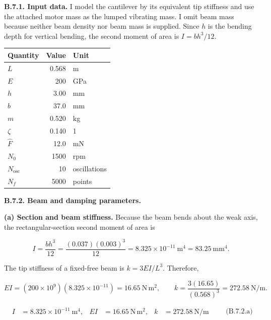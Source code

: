 \begingroup
\setlength{\abovedisplayskip}{6pt}
\setlength{\belowdisplayskip}{6pt}
\setlength{\abovedisplayshortskip}{4pt}
\setlength{\belowdisplayshortskip}{4pt}
\setlength{\intextsep}{6pt}

\textbf{B.7.1. Input data.} I model the cantilever by its equivalent tip stiffness and use the attached motor mass as the lumped vibrating mass. I omit beam mass because neither beam density nor beam mass is supplied. Since $h$ is the bending depth for vertical bending, the second moment of area is $I=bh^3/12$.

{ %
\begin{center}\small\begin{tabular}{@{}lrl@{}}
\toprule\noalign{}
Quantity & Value & Unit \\
\midrule\noalign{}
$L$ & 0.568 & m \\
$E$ & 200 & GPa \\
$h$ & 3.00 & mm \\
$b$ & 37.0 & mm \\
$m$ & 0.520 & kg \\
$\zeta$ & 0.140 & 1 \\
$\hat F$ & 12.0 & mN \\
$N_0$ & 1500 & rpm \\
$N_{\mathrm{osc}}$ & 10 & oscillations \\
$N_f$ & 5000 & points \\
\bottomrule\end{tabular}\end{center}
}

\textbf{B.7.2. Beam and damping parameters.}

\textbf{(a) Section and beam stiffness.} Because the beam bends about the weak axis, the rectangular-section second moment of area is

\[
I=\frac{bh^3}{12}
 =\frac{(0.037)(0.003)^3}{12}
 =8.325\times10^{-11}\ \mathrm{m^4}
 =83.25\ \mathrm{mm^4}.
\]

The tip stiffness of a fixed-free beam is $k=3EI/L^3$. Therefore,

\[
EI=(200\times10^9)(8.325\times10^{-11})
 =16.65\ \mathrm{N\,m^2},
\qquad
k=\frac{3(16.65)}{(0.568)^3}
 =272.58\ \mathrm{N/m}.
\]

\[
\boxed{
\begin{aligned}
I&=8.325\times10^{-11}\ \mathrm{m^4},&
EI&=16.65\ \mathrm{N\,m^2},&
k&=272.58\ \mathrm{N/m}
\end{aligned}}
\qquad\text{(B.7.2.a)}
\]

